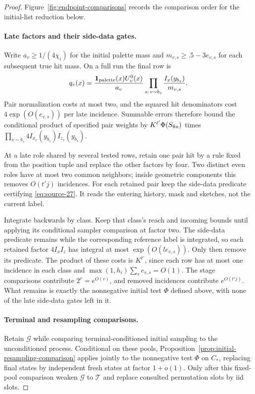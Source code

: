\begin{proof}\leavevmode\par
\noindent
Figure~\ref{fig:endpoint-comparisons} records the comparison order for the initial-list reduction below.

\paragraph{Late factors and their side-data gates.}
Write \(a_v\ge1/(4\chi_i)\) for the initial palette mass and
\(m_{v,s}\ge.5-3e_{v,s}\) for each subsequent true hit mass.
On a full run the final row is
\[
 q_v(x)=\frac{\mathbf1_{\rm palette}(x)U_v^0(x)}{a_v}
       \prod_{s:\,v\sim b_s}\frac{I_x(y_{b_s})}{m_{v,s}}.
\]
Pair normalization costs at most two, and the squared hit denominators
cost \(4\exp(O(e_{v,s}))\) per late incidence. Summable errors
therefore bound the conditional product of specified pair weights by
\(K^{t'}\Phi(S_{\rm fin})\) times
\(\prod_{v\sim b_s}4I_{x_v}(y_{b_s})I_{z_v}(y_{b_s})\).

At a late role shared by several tested rows, retain one pair hit by
a rule fixed from the position tuple and replace the other factors
by four. Two distinct even roles have at most two common neighbors;
inside geometric components this removes \(O(t'j)\) incidences.
For each retained pair keep the side-data predicate certifying
\eqref{eq:source-27}. It reads the entering history, mask and sketches,
not the current label.

Integrate backwards by class. Keep that class's reach and incoming
bounds until applying its conditional sampler comparison at factor
two. The side-data predicate remains while the corresponding reference
label is integrated, so each retained factor \(4I_xI_z\) has
integral at most \(\exp(O(l e_{v,s}))\). Only then remove its
predicate. The product of these costs is \(K^{t'}\), since each row
has at most one incidence in each class and
\(\max(1,h_i)\sum_s e_{v,s}=O(1)\). The stage comparisons contribute
\(2^r=e^{O(r)}\), and removed incidences contribute \(e^{O(t'j)}\).
What remains is exactly the nonnegative initial test \(\Phi\)
defined above, with none of the late side-data gates left in it.

\paragraph{Terminal and resampling comparisons.}
Retain \(\mathcal G\) while comparing terminal-conditioned initial
sampling to the unconditioned process. Conditional on these pools,
Proposition~\ref{prop:initial-resampling-comparison} applies jointly
to the nonnegative test \(\Phi\) on \(C_*\), replacing final states
by independent fresh states at factor \(1+o(1)\). Only after this
fixed-pool comparison weaken \(\mathcal G\) to \(\mathcal T\) and
replace consulted permutation slots by iid slots.


\end{proof}
